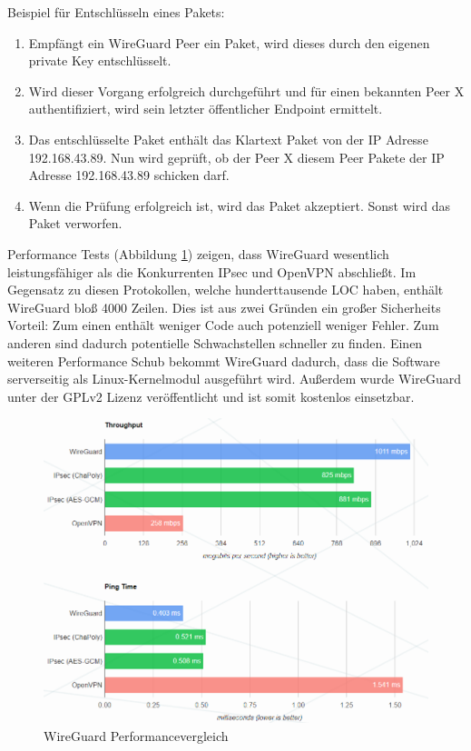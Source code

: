 Beispiel für Entschlüsseln eines Pakets:
\begin{enumerate}
    \item Empfängt ein WireGuard Peer ein Paket, wird dieses durch den eigenen private Key entschlüsselt.
    \item Wird dieser Vorgang erfolgreich durchgeführt und für einen bekannten Peer X authentifiziert, wird sein letzter öffentlicher Endpoint ermittelt.
    \item Das entschlüsselte Paket enthält das Klartext Paket von der IP Adresse 192.168.43.89. Nun wird geprüft, ob der Peer X diesem Peer Pakete der IP Adresse 192.168.43.89 schicken darf. 
    \item Wenn die Prüfung erfolgreich ist, wird das Paket akzeptiert. Sonst wird das Paket verworfen.

\end{enumerate}
\newpage \noindent
Performance Tests (Abbildung \ref{performance}) zeigen, dass WireGuard wesentlich leistungsfähiger als die Konkurrenten IPsec und OpenVPN abschließt. Im Gegensatz zu diesen Protokollen, welche hunderttausende LOC haben, enthält WireGuard bloß 4000 Zeilen. Dies ist aus zwei Gründen ein großer Sicherheits Vorteil: Zum einen enthält weniger Code auch potenziell weniger Fehler. Zum anderen sind dadurch potentielle Schwachstellen schneller zu finden. Einen weiteren Performance Schub bekommt WireGuard dadurch, dass die Software serverseitig als Linux-Kernelmodul ausgeführt wird.
Außerdem wurde WireGuard unter der GPLv2 Lizenz veröffentlicht und ist somit kostenlos einsetzbar.
\begin{figure}[H]
  \centering
  \includegraphics[scale=0.65]{images/performance.PNG}
  \caption{WireGuard Performancevergleich}
  \label{performance}
\end{figure}

